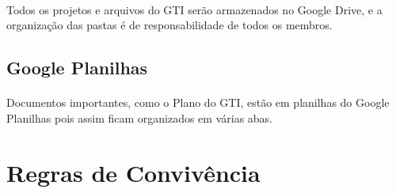 \documentclass{article}
\begin{document}
\paragraph{}
Todos os projetos e arquivos do GTI serão armazenados no Google Drive, e a organização das pastas é de responsabilidade de todos os membros.

\subsection{Google Planilhas}
\paragraph{}
Documentos importantes, como o Plano do GTI, estão em planilhas do Google Planilhas pois assim ficam organizados em várias abas.

\section{Regras de Convivência}
\end{document}
